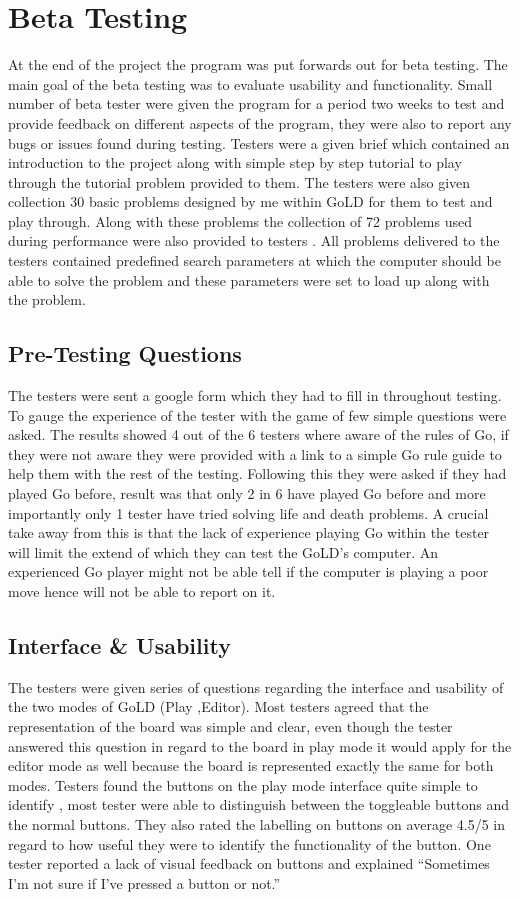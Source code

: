 \documentclass{l4proj}
\begin{document}
\section{Beta Testing}
At the end of the project the program was put forwards out for beta testing. The main goal of the beta testing was to evaluate usability and functionality. Small number of beta tester were given the program for a period two weeks to test and provide feedback on different aspects of the program, they were also to report any bugs or issues found during testing. Testers were a given brief which contained an introduction to the project along with simple step by step tutorial to play through the tutorial problem provided to them. The testers were also given collection 30 basic problems designed by me within GoLD for them to test and play through. Along with these problems the collection of 72 problems used during performance were also provided to testers . All problems delivered to the testers contained predefined search parameters at which the computer should be able to solve the problem and these parameters were set to load up along with the problem.

\subsection{Pre-Testing Questions}
The testers were sent a google form which they had to fill in throughout testing. To gauge the experience of the tester with the game of few simple questions were asked. The results showed 4 out of the 6 testers where aware of the rules of Go, if they were not aware they were provided with a link to a simple Go rule guide to help them with the rest of the testing. Following this they were asked if they had played Go before, result was that only 2 in 6 have played Go before and more importantly only 1 tester have tried solving life and death problems. A crucial take away from this is that the lack of experience playing Go within the tester will limit the extend of which they can test the GoLD’s computer. An experienced Go player might not be able tell if the computer is playing a poor move hence will not be able to report on it.

\subsection{Interface \& Usability}
The testers were given series of questions regarding the interface and usability of the two modes of GoLD (Play ,Editor). Most testers agreed that the representation of the board was simple and clear, even though the tester answered this question in regard to the board in play mode it would apply for the editor mode as well because the board is represented exactly the same for both modes.
Testers found the buttons on the play mode interface quite simple to identify , most tester were able to distinguish between the toggleable buttons and the normal buttons. They also rated the labelling on buttons on average 4.5/5 in regard to how useful they were to identify the functionality of the button. One tester reported a lack of visual feedback on buttons and explained “Sometimes I'm not sure if I've pressed a button or not.”
\end{document}
